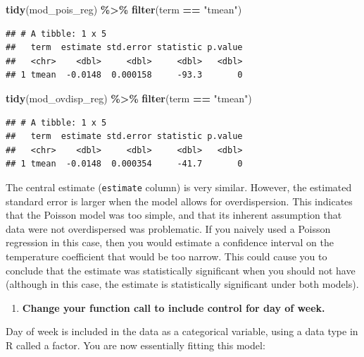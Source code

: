\documentclass[
]{book}
\newenvironment{Shaded}{\begin{snugshade}}{\end{snugshade}}
\newcommand{\FunctionTok}[1]{\textcolor[rgb]{0.13,0.29,0.53}{\textbf{#1}}}
\newcommand{\NormalTok}[1]{#1}
\newcommand{\SpecialCharTok}[1]{\textcolor[rgb]{0.81,0.36,0.00}{\textbf{#1}}}
\newcommand{\StringTok}[1]{\textcolor[rgb]{0.31,0.60,0.02}{#1}}
\providecommand{\tightlist}{%
  \setlength{\itemsep}{0pt}\setlength{\parskip}{0pt}}
\begin{document}
\begin{Shaded}
\begin{Highlighting}[]
\FunctionTok{tidy}\NormalTok{(mod\_pois\_reg) }\SpecialCharTok{\%\textgreater{}\%} 
  \FunctionTok{filter}\NormalTok{(term }\SpecialCharTok{==} \StringTok{"tmean"}\NormalTok{)}
\end{Highlighting}
\end{Shaded}

\begin{verbatim}
## # A tibble: 1 x 5
##   term  estimate std.error statistic p.value
##   <chr>    <dbl>     <dbl>     <dbl>   <dbl>
## 1 tmean  -0.0148  0.000158     -93.3       0
\end{verbatim}

\begin{Shaded}
\begin{Highlighting}[]
\FunctionTok{tidy}\NormalTok{(mod\_ovdisp\_reg) }\SpecialCharTok{\%\textgreater{}\%} 
  \FunctionTok{filter}\NormalTok{(term }\SpecialCharTok{==} \StringTok{"tmean"}\NormalTok{)}
\end{Highlighting}
\end{Shaded}

\begin{verbatim}
## # A tibble: 1 x 5
##   term  estimate std.error statistic p.value
##   <chr>    <dbl>     <dbl>     <dbl>   <dbl>
## 1 tmean  -0.0148  0.000354     -41.7       0
\end{verbatim}

The central estimate (\texttt{estimate} column) is very similar. However, the estimated
standard error is larger when the model allows for overdispersion. This
indicates that the Poisson model was too simple, and that its inherent
assumption that data were not overdispersed was problematic. If you naively used
a Poisson regression in this case, then you would estimate a confidence
interval on the temperature coefficient that would be too narrow. This could
cause you to conclude that the estimate was statistically significant when
you should not have (although in this case, the estimate is statistically
significant under both models).

\begin{enumerate}
\def\labelenumi{\arabic{enumi}.}
\setcounter{enumi}{3}
\tightlist
\item
  \textbf{Change your function call to include control for day of week.}
\end{enumerate}

Day of week is included in the data as a categorical variable, using a
data type in R called a factor. You are now essentially fitting this model:
\end{document}
